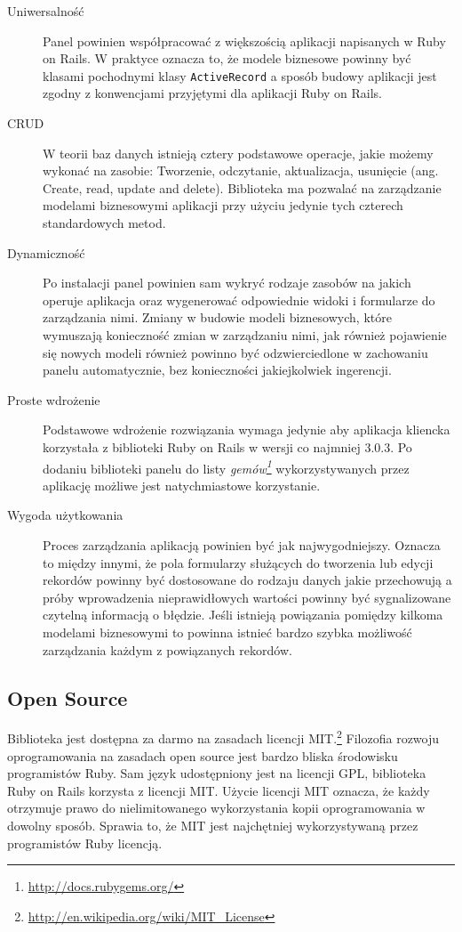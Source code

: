   \begin{description}
    \item[Uniwersalność] Panel powinien współpracować z większością aplikacji napisanych w Ruby on Rails. W praktyce oznacza to, że modele biznesowe powinny być klasami pochodnymi klasy \texttt{ActiveRecord} a sposób budowy aplikacji jest zgodny z konwencjami przyjętymi dla aplikacji Ruby on Rails.
    \item[CRUD] W teorii baz danych istnieją cztery podstawowe operacje, jakie możemy wykonać na zasobie: Tworzenie, odczytanie, aktualizacja, usunięcie (ang. Create, read, update and delete). Biblioteka ma pozwalać na zarządzanie modelami biznesowymi aplikacji przy użyciu jedynie tych czterech standardowych metod.
    \item[Dynamiczność] Po instalacji panel powinien sam wykryć rodzaje zasobów na jakich operuje aplikacja oraz wygenerować odpowiednie widoki i formularze do zarządzania nimi. Zmiany w budowie modeli biznesowych, które wymuszają konieczność zmian w zarządzaniu nimi, jak również pojawienie się nowych modeli również powinno być odzwierciedlone w zachowaniu panelu automatycznie, bez konieczności jakiejkolwiek ingerencji.
    \item[Proste wdrożenie] Podstawowe wdrożenie rozwiązania wymaga jedynie aby aplikacja kliencka korzystała z biblioteki Ruby on Rails w wersji co najmniej 3.0.3. Po dodaniu biblioteki panelu do listy \emph{gemów\footnote{\url{http://docs.rubygems.org/}}} wykorzystywanych przez aplikację możliwe jest natychmiastowe korzystanie.
    \item[Wygoda użytkowania] Proces zarządzania aplikacją powinien być jak najwygodniejszy. Oznacza to między innymi, że pola formularzy służących do tworzenia lub edycji rekordów powinny być dostosowane do rodzaju danych jakie przechowują a próby wprowadzenia nieprawidłowych wartości powinny być sygnalizowane czytelną informacją o błędzie. Jeśli istnieją powiązania pomiędzy kilkoma modelami biznesowymi to powinna istnieć bardzo szybka możliwość zarządzania każdym z powiązanych rekordów.
  \end{description}
  
  \subsection{Open Source}
    Biblioteka jest dostępna za darmo na zasadach licencji MIT.\footnote{\url{http://en.wikipedia.org/wiki/MIT_License}} Filozofia rozwoju oprogramowania na zasadach open source jest bardzo bliska środowisku programistów Ruby. Sam język udostępniony jest na licencji GPL, biblioteka Ruby on Rails korzysta z licencji MIT. Użycie licencji MIT oznacza, że każdy otrzymuje prawo do nielimitowanego wykorzystania kopii oprogramowania w dowolny sposób. Sprawia to, że MIT jest  najchętniej wykorzystywaną przez programistów Ruby licencją.
    

